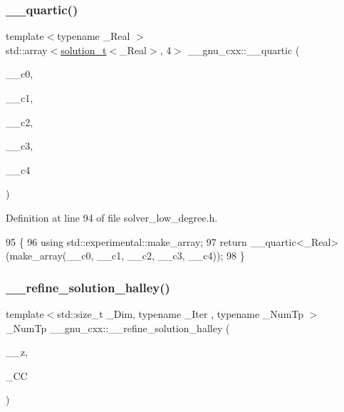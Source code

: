 \subsubsection{\texorpdfstring{\+\_\+\+\_\+quartic()}{\_\_quartic()}\hspace{0.1cm}{\footnotesize\ttfamily [2/2]}}
{\footnotesize\ttfamily template$<$typename \+\_\+\+Real $>$ \\
std\+::array$<$\hyperlink{namespace____gnu__cxx_ae20ea642de50eb361074c62676b0159c}{solution\+\_\+t}$<$\+\_\+\+Real$>$, 4$>$ \+\_\+\+\_\+gnu\+\_\+cxx\+::\+\_\+\+\_\+quartic (\begin{DoxyParamCaption}\item[{\+\_\+\+Real}]{\+\_\+\+\_\+c0,  }\item[{\+\_\+\+Real}]{\+\_\+\+\_\+c1,  }\item[{\+\_\+\+Real}]{\+\_\+\+\_\+c2,  }\item[{\+\_\+\+Real}]{\+\_\+\+\_\+c3,  }\item[{\+\_\+\+Real}]{\+\_\+\+\_\+c4 }\end{DoxyParamCaption})\hspace{0.3cm}{\ttfamily [inline]}}



Definition at line 94 of file solver\+\_\+low\+\_\+degree.\+h.


\begin{DoxyCode}
95     \{
96       \textcolor{keyword}{using} std::experimental::make\_array;
97       \textcolor{keywordflow}{return} \_\_quartic<\_Real>(make\_array(\_\_c0, \_\_c1, \_\_c2, \_\_c3, \_\_c4));
98     \}
\end{DoxyCode}
\mbox{\label{namespace____gnu__cxx_a957b92036746a66f3dff0c46cb18120b}} 
\subsubsection{\texorpdfstring{\+\_\+\+\_\+refine\+\_\+solution\+\_\+halley()}{\_\_refine\_solution\_halley()}}
{\footnotesize\ttfamily template$<$std\+::size\+\_\+t \+\_\+\+Dim, typename \+\_\+\+Iter , typename \+\_\+\+Num\+Tp $>$ \\
\+\_\+\+Num\+Tp \+\_\+\+\_\+gnu\+\_\+cxx\+::\+\_\+\+\_\+refine\+\_\+solution\+\_\+halley (\begin{DoxyParamCaption}\item[{\+\_\+\+Num\+Tp}]{\+\_\+\+\_\+z,  }\item[{const \+\_\+\+Iter \&}]{\+\_\+\+CC }\end{DoxyParamCaption})}

